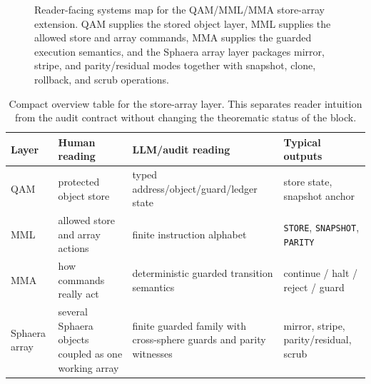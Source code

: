 \begin{figure}[H]
\centering
{}
\caption{Reader-facing systems map for the QAM/MML/MMA store-array extension. QAM supplies the stored object layer, MML supplies the allowed store and array commands, MMA supplies the guarded execution semantics, and the Sphaera array layer packages mirror, stripe, and parity/residual modes together with snapshot, clone, rollback, and scrub operations.}
\label{fig:qam-mml-mma-store-array-map}
\end{figure}

\begin{table}[H]
\centering
\small
\begin{tabular}{>{\raggedright\arraybackslash}p{} >{\raggedright\arraybackslash}p{} >{\raggedright\arraybackslash}p{} >{\raggedright\arraybackslash}p{}}
\toprule
\textbf{Layer} & \textbf{Human reading} & \textbf{LLM/audit reading} & \textbf{Typical outputs}\\
\midrule
QAM & protected object store & typed address/object/guard/ledger state & store state, snapshot anchor\\
MML & allowed store and array actions & finite instruction alphabet & \texttt{STORE}, \texttt{SNAPSHOT}, \texttt{PARITY}\\
MMA & how commands really act & deterministic guarded transition semantics & continue / halt / reject / guard\\
Sphaera array & several Sphaera objects coupled as one working array & finite guarded family with cross-sphere guards and parity witnesses & mirror, stripe, parity/residual, scrub\\
\bottomrule
\end{tabular}
\caption{Compact overview table for the store-array layer. This separates reader intuition from the audit contract without changing the theorematic status of the block.}
\label{tab:qam-mml-mma-store-array-overview}
\end{table}


